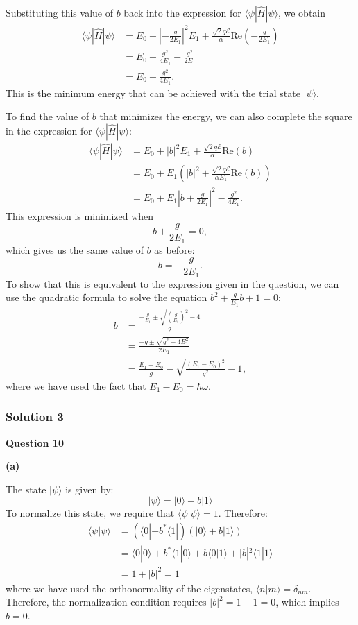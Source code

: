 \documentclass{article}
\begin{document}
Substituting this value of \(b\) back into the expression for \(\langle \psi | \hat{H} | \psi \rangle\), we obtain
\begin{align*}
\langle \psi | \hat{H} | \psi \rangle &= E_0 + \left| -\frac{g}{2 E_1} \right|^2 E_1 + \frac{\sqrt{2} q \mathcal{E}}{\alpha} \text{Re} \left( -\frac{g}{2 E_1} \right) \\
&= E_0 + \frac{g^2}{4 E_1} - \frac{g^2}{2 E_1} \\
&= E_0 - \frac{g^2}{4 E_1}.
\end{align*}
This is the minimum energy that can be achieved with the trial state \(|\psi\rangle\).

To find the value of \(b\) that minimizes the energy, we can also complete the square in the expression for \(\langle \psi | \hat{H} | \psi \rangle\):
\begin{align*}
\langle \psi | \hat{H} | \psi \rangle &= E_0 + |b|^2 E_1 + \frac{\sqrt{2} q \mathcal{E}}{\alpha} \text{Re}(b) \\
&= E_0 + E_1 \left( |b|^2 + \frac{\sqrt{2} q \mathcal{E}}{\alpha E_1} \text{Re}(b) \right) \\
&= E_0 + E_1 \left| b + \frac{g}{2 E_1} \right|^2 - \frac{g^2}{4 E_1}.
\end{align*}
This expression is minimized when
\[
b + \frac{g}{2 E_1} = 0,
\]
which gives us the same value of \(b\) as before:
\[
b = -\frac{g}{2 E_1}.
\]
To show that this is equivalent to the expression given in the question, we can use the quadratic formula to solve the equation \(b^2 + \frac{g}{E_1} b + 1 = 0\):
\begin{align*}
b &= \frac{-\frac{g}{E_1} \pm \sqrt{\left( \frac{g}{E_1} \right)^2 - 4}}{2} \\
&= \frac{-g \pm \sqrt{g^2 - 4 E_1^2}}{2 E_1} \\
&= \frac{E_1 - E_0}{g} - \sqrt{\frac{(E_1 - E_0)^2}{g^2} - 1},
\end{align*}
where we have used the fact that \(E_1 - E_0 = \hbar \omega\).


\subsubsection{Solution 3}
\textbf{Question 10}

\textbf{(a)} 

The state $|\psi\rangle$ is given by:
\begin{equation*}
|\psi\rangle = |0\rangle + b|1\rangle
\end{equation*}
To normalize this state, we require that $\langle \psi | \psi \rangle = 1$.  Therefore:
\begin{align*}
\langle \psi | \psi \rangle &= (\langle 0 | + b^* \langle 1 | )(|0\rangle + b|1\rangle ) \\
&= \langle 0 | 0 \rangle + b^* \langle 1 | 0 \rangle + b \langle 0 | 1 \rangle + |b|^2 \langle 1 | 1 \rangle \\
&= 1 + |b|^2 = 1
\end{align*}
where we have used the orthonormality of the eigenstates, $\langle n | m \rangle = \delta_{nm}$.  Therefore, the normalization condition requires $|b|^2 = 1 - 1 = 0$, which implies $b = 0$.  
\end{document}
